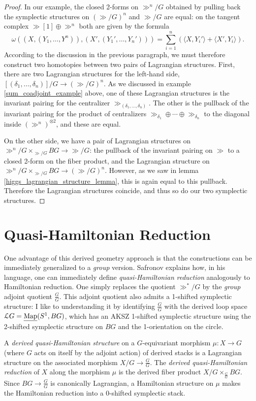 \documentclass[10pt, oneside, a4paper]{article}
\newcommand{\Map}{\ul{\mr{Map}}}
\begin{document}
\begin{proof}
In our example, the closed 2-forms on $\gg^n/G$ obtained by pulling back the symplectic structures on $\left(\gg/G\right)^n$ and $\gg/G$ are equal: on the tangent complex $\gg[1] \oplus \gg^n$ both are given by the formula 
\[\omega((X, (Y_1, \ldots, Y^n)), (X', (Y_1', \ldots, Y_n'))) = \sum_{i=1}^n \left( \langle X, Y_i' \rangle + \langle X', Y_i \rangle \right).\]
According to the discussion in the previous paragraph, we must therefore construct two homotopies between two pairs of Lagrangian structures.  First, there are two Lagrangian structures for the left-hand side, $[(\delta_1, \ldots, \delta_n)]/G \to \left(\gg/G\right)^n$.  As we discussed in example \ref{sum_coadjoint_example} above, one of these Lagrangian structures is the invariant pairing for the centralizer $\gg_{(\delta_1, \ldots, \delta_n)}$.  The other is the pullback of the invariant pairing for the product of centralizers $\gg_{\delta_1} \oplus \cdots \oplus \gg_{\delta_n}$ to the diagonal inside $(\gg^n)^{\otimes 2}$, and these are equal.

On the other side, we have a pair of Lagrangian structures on $\gg^n/G \times_{\gg/G} BG \to \gg/G$: the pullback of the invariant pairing on $\gg$ to a closed 2-form on the fiber product, and the Lagrangian structure on $\gg^n/G \times_{\gg/G} BG \to \left(\gg/G\right)^n$.  However, as we saw in lemma \ref{higgs_lagrangian_structure_lemma}, this is again equal to this pullback.  Therefore the Lagrangian structures coincide, and thus so do our two symplectic structures.
\end{proof}

\section{Quasi-Hamiltonian Reduction}
One advantage of this derived geometry approach is that the constructions can be immediately generalized to a \emph{group} version.  Safronov explains how, in his language, one can immediately define \emph{quasi-Hamiltonian reduction} analogously to Hamiltonian reduction.  One simply replaces the quotient $\gg^*/G$ by the \emph{group} adjoint quotient $\frac GG$.  This adjoint quotient also admits a 1-shifted symplectic structure: I like to understanding it by identifying $\frac GG$ with the derived loop space $\mc L G = \Map(S^1, BG)$, which has an AKSZ 1-shifted symplectic structure using the 2-shifted symplectic structure on $BG$ and the 1-orientation on the circle.
\begin{definition}[Safronov]
A \emph{derived quasi-Hamiltonian structure} on a $G$-equivariant morphism $\mu \colon X \to G$ (where $G$ acts on itself by the adjoint action) of derived stacks is a Lagrangian structure on the associated morphism $X/G \to \frac GG$.  The \emph{derived quasi-Hamiltonian reduction} of $X$ along the morphism $\mu$ is the derived fiber product $X/G \times_{\frac GG} BG$.  Since $BG \to \frac GG$ is canonically Lagrangian, a Hamiltonian structure on $\mu$ makes the Hamiltonian reduction into a 0-shifted symplectic stack. 
\end{definition}
\end{document}
